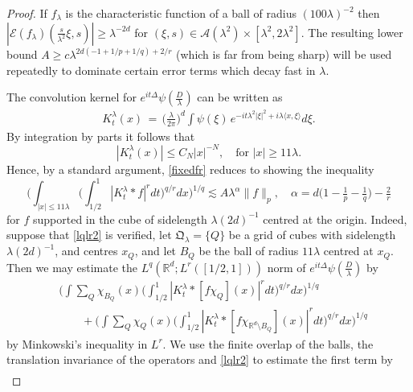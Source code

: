 \documentclass[11pt]{amsart}
\theoremstyle{definition}
\numberwithin{theorem}{section}
\numberwithin{definition}{section}
\numberwithin{equation}{section}
\def\inn#1#2{\langle#1,#2\rangle}
\newcommand{\Be}{\begin{equation}}
\newcommand{\Ee}{\end{equation}}
\renewcommand{\le}{\leqslant}
\renewcommand{\ge}{\geqslant}
\def\inn#1#2{\langle#1,#2\rangle}
\def\lc{\lesssim}
\def\la{\lambda}             \def\La{\Lambda}
\def\fQ{{\mathfrak {Q}}}
\def\bbR{{\mathbb {R}}}
\def\cA{{\mathcal {A}}}
\def\cE{{\mathcal {E}}}
\renewcommand{\le}{\leqslant}
\renewcommand{\ge}{\geqslant}
\begin{document}
\begin{proof}[Proof]
If $f_\la$ is the characteristic function  of a ball of radius $(100
\la)^{-2}$ then $|\cE (f_\la)(\tfrac{ s }{\la^2}\xi,  s )|\ge
\la^{-2d}$ for $(\xi, s )\in \cA(\la^2)\times [\la^2,2\la^2]$. The
resulting lower bound $A\ge c \la^{2d(-1+ 1/p+ 1/q)+2/r}$ (which  is
far from being sharp) will be used repeatedly to dominate certain
error terms which decay fast in $\la$.


The convolution kernel for $e^{it\Delta}\psi(\tfrac D\la )$ can be written
as
\begin{align*}K^\la_t(x)
\,=\,\Big(\frac{\la}{2\pi}\Big)^d \int \psi(\xi)\, e^{-it\la^2|\xi|^2+i\la\inn x\xi} d\xi.
\end{align*}
By integration by parts it follows that   \Be \label{offexcset}
|K^\la_t(x)| \le C_N|x|^{-N},  \quad\text{for $|x|\ge 11\la$.} \Ee
Hence, by a standard argument, \eqref{fixedfr} reduces to showing the
inequality \Be\label{lqlr2}\Big(\int_{|x|\le 11 \la}
\Big(\int_{1/2}^1 |K^\la_t*f|^r dt\Big)^{q/r} dx\Big)^{1/q}
 \lc A \la^{\alpha} \|f\|_p, \quad  \alpha =  d\big(1-\tfrac 1p-\tfrac 1q)-\tfrac 2r
\Ee for $f$ supported in the cube of sidelength $\la(2d)^{-1}$
centred at the origin. Indeed, suppose  that \eqref{lqlr2} is
verified, let $\fQ_\la=\{Q\}$ be a grid of cubes with
 sidelength $\la(2d)^{-1}$, and centres $x_Q$, and let $B_Q$ be the ball of radius $11\la$ centred at $x_Q$.
Then we may estimate the $L^q(\mathbb R^d; L^r([1/2,1]))$ norm of
$e^{it\Delta}\psi(\tfrac D\la )$ by
 \Be \label{twoterms}
\begin{aligned}
&\Big(\int \sum_Q \chi_{B_Q}(x) \Big(\int_{1/2}^1
|K^\la_t*[f\chi_Q](x)|^r dt\Big)^{q/r} dx\Big)^{1/q}
\\ &\qquad+
\Big(\int \sum_Q \chi_Q(x) \Big(\int_{1/2}^1
|K^\la_t*[f\chi_{\bbR^d\setminus B_Q}](x)|^r dt\Big)^{q/r}
dx\Big)^{1/q}
\end{aligned}
\Ee by Minkowski's inequality in $L^r$. We use  the finite overlap
of the balls, the translation invariance of the operators  and
\eqref{lqlr2} to estimate
the first term  by %
\begin{align*}

\end{align*}
\end{proof}
\end{document}
